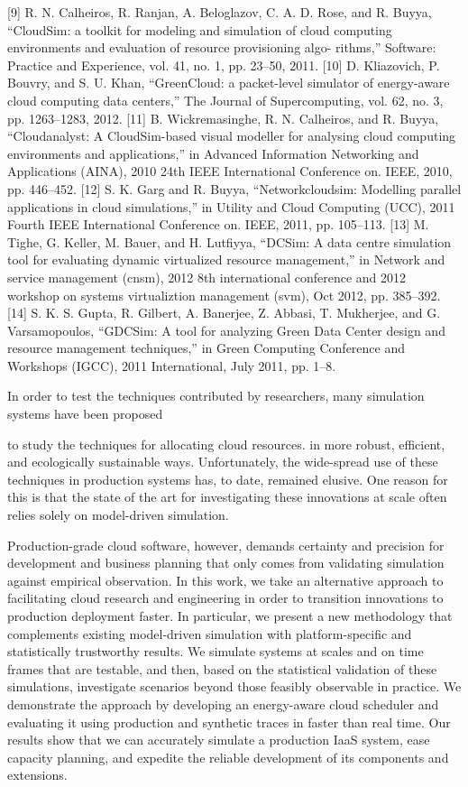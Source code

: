 [9] R. N. Calheiros, R. Ranjan, A. Beloglazov, C. A. D. Rose, and R. Buyya, “CloudSim: a toolkit for modeling and simulation of cloud computing environments and evaluation of resource provisioning algo- rithms,” Software: Practice and Experience, vol. 41, no. 1, pp. 23–50,
2011.
[10] D. Kliazovich, P. Bouvry, and S. U. Khan, “GreenCloud: a packet-level simulator of energy-aware cloud computing data centers,” The Journal
of Supercomputing, vol. 62, no. 3, pp. 1263–1283, 2012.
[11] B. Wickremasinghe, R. N. Calheiros, and R. Buyya, “Cloudanalyst: A CloudSim-based visual modeller for analysing cloud computing environments and applications,” in Advanced Information Networking
and Applications (AINA), 2010 24th IEEE International Conference on.
IEEE, 2010, pp. 446–452.
[12] S. K. Garg and R. Buyya, “Networkcloudsim: Modelling parallel applications in cloud simulations,” in Utility and Cloud Computing
(UCC), 2011 Fourth IEEE International Conference on. IEEE, 2011,
pp. 105–113.
[13] M. Tighe, G. Keller, M. Bauer, and H. Lutfiyya, “DCSim: A data centre simulation tool for evaluating dynamic virtualized resource management,” in Network and service management (cnsm), 2012 8th
international conference and 2012 workshop on systems virtualiztion
management (svm), Oct 2012, pp. 385–392.
[14] S. K. S. Gupta, R. Gilbert, A. Banerjee, Z. Abbasi, T. Mukherjee, and G. Varsamopoulos, “GDCSim: A tool for analyzing Green Data Center design and resource management techniques,” in Green Computing
Conference and Workshops (IGCC), 2011 International, July 2011, pp.
1–8.


In order to test the techniques contributed by researchers, many simulation  systems  
have  been  proposed 


 to  study the techniques for  allocating  cloud  resources. in  more  robust,  efficient,  and
ecologically  sustainable  ways. Unfortunately,  the  wide-spread  use of  these
techniques in production systems has, to  date, remained elusive. One reason for
this is that the  state of the art for investigating  these innovations at scale
often  relies solely  on model-driven  simulation.


 Production-grade  cloud software,  however, demands  certainty and  precision for  development and  business
planning  that   only  comes   from  validating  simulation   against  empirical
observation.   In this  work, we  take an  alternative approach  to facilitating
cloud research and engineering in  order to transition innovations to production
deployment faster.  In particular, we present a new methodology that complements
existing  model-driven  simulation   with  platform-specific  and  statistically
trustworthy results.  We simulate systems at  scales and on time frames that are
testable, and  then, based on  the statistical validation of  these simulations,
investigate  scenarios   beyond  those  feasibly  observable   in  practice.  We
demonstrate  the approach  by  developing an  energy-aware  cloud scheduler  and
evaluating it  using production and synthetic  traces in faster than  real time.
Our results show that we can  accurately simulate a production IaaS system, ease
capacity planning, and  expedite the reliable development of  its components and
extensions.
